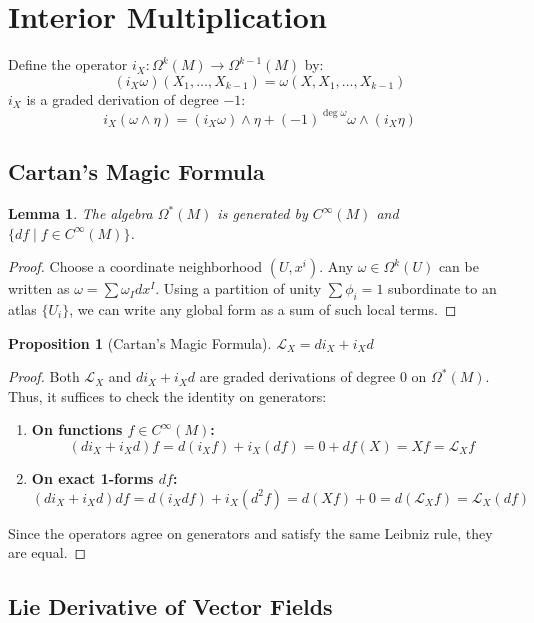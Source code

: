 \documentclass[11pt, a4paper]{article}
\theoremstyle{plain}
\newtheorem{lemma}[theorem]{Lemma}
\newtheorem{proposition}[theorem]{Proposition}
\theoremstyle{definition}
\theoremstyle{remark}
\begin{document}
\section*{Interior Multiplication}
Define the operator $i_X: \Omega^k(M) \to \Omega^{k-1}(M)$ by:
\[
(i_X \omega)(X_1, \dots, X_{k-1}) = \omega(X, X_1, \dots, X_{k-1})
\]
$i_X$ is a graded derivation of degree $-1$:
\[
i_X(\omega \wedge \eta) = (i_X \omega) \wedge \eta + (-1)^{\deg \omega} \omega \wedge (i_X \eta)
\]

\subsection{Cartan's Magic Formula}

\begin{lemma}
The algebra $\Omega^*(M)$ is generated by $C^\infty(M)$ and $\{df \mid f \in C^\infty(M)\}$.
\end{lemma}
\begin{proof}
Choose a coordinate neighborhood $(U, x^i)$. Any $\omega \in \Omega^k(U)$ can be written as $\omega = \sum \omega_I dx^I$. Using a partition of unity $\sum \phi_i = 1$ subordinate to an atlas $\{U_i\}$, we can write any global form as a sum of such local terms.
\end{proof}

\begin{proposition}[Cartan's Magic Formula]
$\mathcal{L}_X = d i_X + i_X d$
\end{proposition}
\begin{proof}
Both $\mathcal{L}_X$ and $d i_X + i_X d$ are graded derivations of degree 0 on $\Omega^*(M)$. Thus, it suffices to check the identity on generators:
\begin{enumerate}
    \item \textbf{On functions $f \in C^\infty(M)$:}
    \[ (d i_X + i_X d)f = d(i_X f) + i_X(df) = 0 + df(X) = Xf = \mathcal{L}_X f \]
    \item \textbf{On exact 1-forms $df$:}
    \[ (d i_X + i_X d)df = d(i_X df) + i_X(d^2 f) = d(Xf) + 0 = d(\mathcal{L}_X f) = \mathcal{L}_X (df) \]
\end{enumerate}
Since the operators agree on generators and satisfy the same Leibniz rule, they are equal.
\end{proof}

\subsection{Lie Derivative of Vector Fields}
\end{document}
